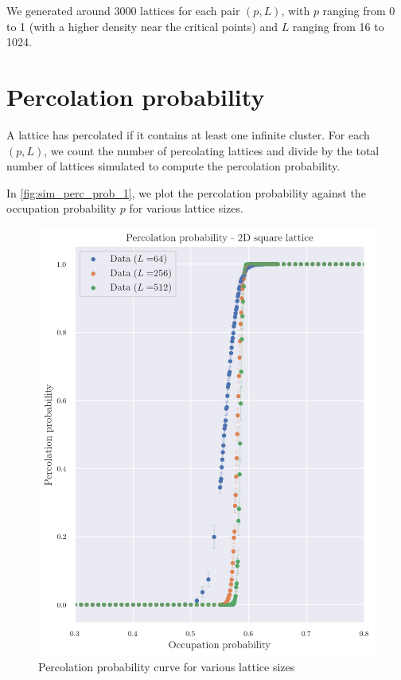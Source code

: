 We generated around 3000 lattices for each pair $(p, L)$, with $p$ ranging from 0 to 1 (with a higher density near the critical points) and $L$ ranging from 16 to 1024.


\section{Percolation probability}
\label{sec:sim_perc_prob}

A lattice has percolated if it contains at least one infinite cluster. For each $(p, L)$, we count the number of percolating lattices and divide by the total number of lattices simulated to compute the percolation probability.

In \autoref{fig:sim_perc_prob_1}, we plot the percolation probability against the occupation probability $p$ for various lattice sizes.


\begin{figure}[H]
  \includegraphics[width=\linewidth]{Images/sim_perc_prob_1.png}
  \caption{Percolation probability curve for various lattice sizes}
  \label{fig:sim_perc_prob_1}
\end{figure}

